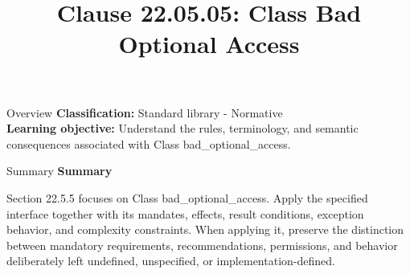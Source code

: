 \documentclass[10pt,letterpaper]{article}
\title{Clause 22.05.05: Class Bad Optional Access}
\author{}
\date{}
\begin{document}
\maketitle
\begin{CornellOverviewBox}{Overview}
\textbf{Classification:} Standard library - Normative\\[2pt]
\textbf{Learning objective:} Understand the rules, terminology, and semantic consequences associated with Class bad\_optional\_access.
\end{CornellOverviewBox}\begin{CornellSummaryBox}{Summary}
{\sffamily\bfseries\color{Accent} Summary}\par\vspace{3pt}Section 22.5.5 focuses on Class bad\_optional\_access. Apply the specified interface together with its mandates, effects, result conditions, exception behavior, and complexity constraints. When applying it, preserve the distinction between mandatory requirements, recommendations, permissions, and behavior deliberately left undefined, unspecified, or implementation-defined.
\end{CornellSummaryBox}
\end{document}

